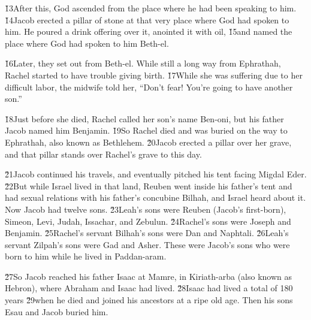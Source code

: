 \v{13}After this, God ascended from the place where he had been speaking to him. \v{14}Jacob erected a pillar of stone at that very place where God had spoken to him. He poured a drink offering over it, anointed it with oil, \v{15}and named the place where God had spoken to him Beth-el.

\v{16}Later, they set out from Beth-el. While still a long way from Ephrathah, Rachel started to have trouble giving birth. \v{17}While she was suffering due to her difficult labor, the midwife told her, ``Don't fear! You're going to have another son.''

\v{18}Just before she died, Rachel called her son's name Ben-oni, but his father Jacob named him Benjamin. \v{19}So Rachel died and was buried on the way to Ephrathah, also known as Bethlehem. \v{20}Jacob erected a pillar over her grave, and that pillar stands over Rachel's grave to this day.

\v{21}Jacob continued his travels, and eventually pitched his tent facing Migdal Eder. \v{22}But while Israel lived in that land, Reuben went inside his father's tent and had sexual relations with his father's concubine Bilhah, and Israel heard about it. Now Jacob had twelve sons. \v{23}Leah's sons were Reuben (Jacob's first-born), Simeon, Levi, Judah, Issachar, and Zebulun. \v{24}Rachel's sons were Joseph and Benjamin. \v{25}Rachel's servant Bilhah's sons were Dan and Naphtali. \v{26}Leah's servant Zilpah's sons were Gad and Asher. These were Jacob's sons who were born to him while he lived in Paddan-aram.

\v{27}So Jacob reached his father Isaac at Mamre, in Kiriath-arba (also known as Hebron), where Abraham and Isaac had lived. \v{28}Isaac had lived a total of 180 years \v{29}when he died and joined his ancestors at a ripe old age. Then his sons Esau and Jacob buried him.


